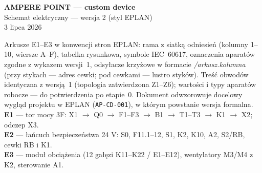 \documentclass[10pt,a4paper,landscape]{article}
\begin{document}
\begin{center}
\vspace*{2.2cm}
{\LARGE\bfseries AMPERE POINT --- custom device}\\[6pt]
{\Large Schemat elektryczny --- wersja 2 (styl EPLAN)}\\[10pt]
{\normalsize 3 lipca 2026}\\[16pt]
\begin{minipage}{0.78\textwidth}\small
Arkusze E1--E3 w konwencji stron EPLAN: rama z siatką odniesień (kolumny 1--10, wiersze A--F),
tabelka rysunkowa, symbole IEC~60617, oznaczenia aparatów zgodne z wykazem wersji~1,
odsyłacze krzyżowe w formacie \emph{/arkusz.kolumna} (przy stykach --- adres cewki; pod cewkami --- lustro styków).
Treść obwodów identyczna z wersją~1 (topologia zatwierdzona Z1--Z6); wartości i typy aparatów robocze ---
do potwierdzenia po etapie~0. Dokument odwzorowuje docelowy wygląd projektu w EPLAN
(\texttt{AP-CD-001}), w którym powstanie wersja formalna.\\[8pt]
\textbf{E1} --- tor mocy 3F: X1 $\to$ Q0 $\to$ F1--F3 $\to$ B1 $\to$ T1--T3 $\to$ K1 $\to$ X2; odczep X3.\\
\textbf{E2} --- łańcuch bezpieczeństwa 24 V: S0, F11.1--12, S1, K2, K10, A2, S2/RB, cewki RB i K1.\\
\textbf{E3} --- moduł obciążenia (12 gałęzi K11--K22 / E1--E12), wentylatory M3/M4 z K2, sterowanie A1.
\end{minipage}
\end{center}
\newpage
\end{document}
